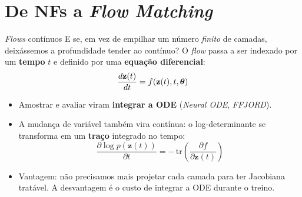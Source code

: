 \documentclass[aspectratio=169,xcolor=dvipsnames]{beamer}
\begin{document}
  \section{De NFs a \textit{Flow Matching}}

  \begin{frame}{\textit{Flows} contínuos}
    E se, em vez de empilhar um número \emph{finito} de camadas, deixássemos a
    profundidade tender ao contínuo? O \textit{flow} passa a ser indexado por um
    \textbf{tempo} $t$ e definido por uma \textbf{equação diferencial}:
    \vspace{0.2em}
    \[
      \frac{d\mathbf{z}(t)}{dt} = f\!\left(\mathbf{z}(t), t, \bm{\theta}\right)
    \]
    \vspace{0.1em}
    \begin{itemize}
      \item Amostrar e avaliar viram \textbf{integrar a ODE} (\textit{Neural ODE}, \textit{FFJORD}).
      \item A mudança de variável também vira contínua: o
      \textcolor{EncRed}{log-determinante} se transforma em um
      \textbf{traço} integrado no tempo:
      \[
        \frac{\partial \log p(\mathbf{z}(t))}{\partial t}
        = -\,\mathrm{tr}\!\left(\frac{\partial f}{\partial \mathbf{z}(t)}\right)
      \]
      \item Vantagem: não precisamos mais projetar cada camada para ter Jacobiana
      tratável. A desvantagem é o custo de integrar a ODE durante o treino.
    \end{itemize}
  \end{frame}
\end{document}
